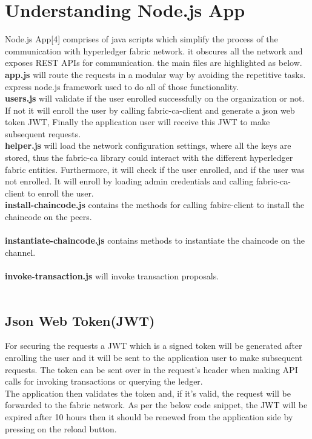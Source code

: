 \section{Understanding Node.js App} 
Node.js App[4] comprises of java scripts which simplify the process of the communication with hyperledger fabric network. it obscures all the network and exposes REST APIs for communication. the main files are highlighted as below. 
\ \\ 
\textbf{app.js} will route the requests in a modular way by avoiding the repetitive tasks. express node.js framework used to do all of those functionality. 
\ \\ 
\textbf{users.js} will validate if the user enrolled successfully on the organization or not. If not it will enroll the user by calling fabric-ca-client and generate a  json web token JWT, Finally the application user will receive this JWT to make subsequent requests. 
\ \\ 
\textbf{helper.js} will load the network configuration settings, where all the keys are stored, thus the fabric-ca library could interact with the different hyperledger fabric entities. Furthermore, it will check if the user enrolled, and if the user was not enrolled.  It will enroll by loading admin credentials and calling fabric-ca-client to enroll the user.
\ \\ 
\textbf{install-chaincode.js} contains the methods for calling fabirc-client to install the chaincode on the peers.  \\ 
\ \\ 
\textbf{instantiate-chaincode.js} contains methods to instantiate the chaincode on the channel.  \\ 
\ \\  
\textbf{invoke-transaction.js} will invoke transaction proposals. \\
\ \\

\cleardoublepage
\subsection{ Json Web Token(JWT) }
For securing the requests a JWT which is a signed token will be generated after enrolling the user and it will be sent to the application user to make subsequent requests.
The token can be sent over in the request's header when making API calls for invoking transactions or querying the ledger.\\ 
The application then validates the token and, if it’s valid, the request will be forwarded to the fabric network.
As per the below code snippet, the JWT will be expired after 10 hours then it should be renewed from the application side by pressing on the reload button.  \\ 

